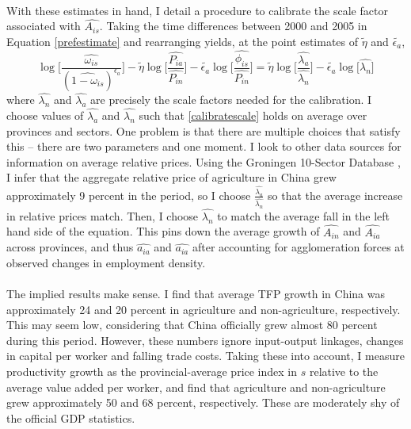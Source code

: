 \documentclass[]{article}
\theoremstyle{plain}
\begin{document}
\paragraph*{}
With these estimates in hand, I detail a procedure to calibrate the scale factor associated with $\hat{A_{is}}$. Taking the time differences between 2000 and 2005 in Equation \eqref{prefestimate} and rearranging yields, at the point estimates of $\tilde{\eta}$ and $\tilde{\epsilon_{a}}$,
\begin{equation}\label{calibratescale}
		\log\bigg[\frac{\hat{\omega_{is}}}{(\hat{1-\omega_{is}})^{\epsilon_{a}}}\bigg] - \tilde{\eta}\log\bigg[\frac{\hat{P_{ia}}}{\hat{P_{in}}}\bigg] - \tilde{\epsilon_{a}}\log\bigg[\frac{\hat{\phi_{is}}}{\hat{P_{in}}}\bigg] = \tilde{\eta}\log\bigg[\frac{\hat{\lambda_{a}}}{\hat{\lambda_{n}}}\bigg] - \tilde{\epsilon_{a}}\log\bigg[\hat{\lambda_{n}}\bigg] 
\end{equation}
where $\hat{\lambda_{n}}$ and $\hat{\lambda_{a}}$ are precisely the scale factors needed for the calibration. I choose values of $\hat{\lambda_{a}}$ and $\hat{\lambda_{n}}$ such that \eqref{calibratescale} holds on average over provinces and sectors. One problem is that there are multiple choices that satisfy this -- there are two parameters and one moment. I look to other data sources for information on average relative prices. Using the Groningen 10-Sector Database \citep{10sector}, I infer that the aggregate relative price of agriculture in China grew approximately 9 percent in the period, so I choose $\frac{\hat{\lambda_{a}}}{\hat{\lambda_{n}}}$ so that the average increase in relative prices match. Then, I choose $\hat{\lambda_{n}}$ to match the average fall in the left hand side of the equation. This pins down the average growth of $\hat{A_{in}}$ and $\hat{A_{ia}}$ across provinces, and thus $\hat{a_{ia}}$ and $\hat{a_{ia}}$ after accounting for agglomeration forces at observed changes in employment density. 
\paragraph*{}
The implied results make sense. I find that average TFP growth in China was approximately 24 and 20 percent in agriculture and non-agriculture, respectively. This may seem low, considering that China officially grew almost 80 percent during this period. However, these numbers ignore input-output linkages, changes in capital per worker and falling trade costs. Taking these into account, I measure productivity growth as the provincial-average price index in $s$ relative to the average value added per worker, and find that agriculture and non-agriculture grew approximately 50 and 68 percent, respectively. These are moderately shy of the official GDP statistics. 
\end{document}
